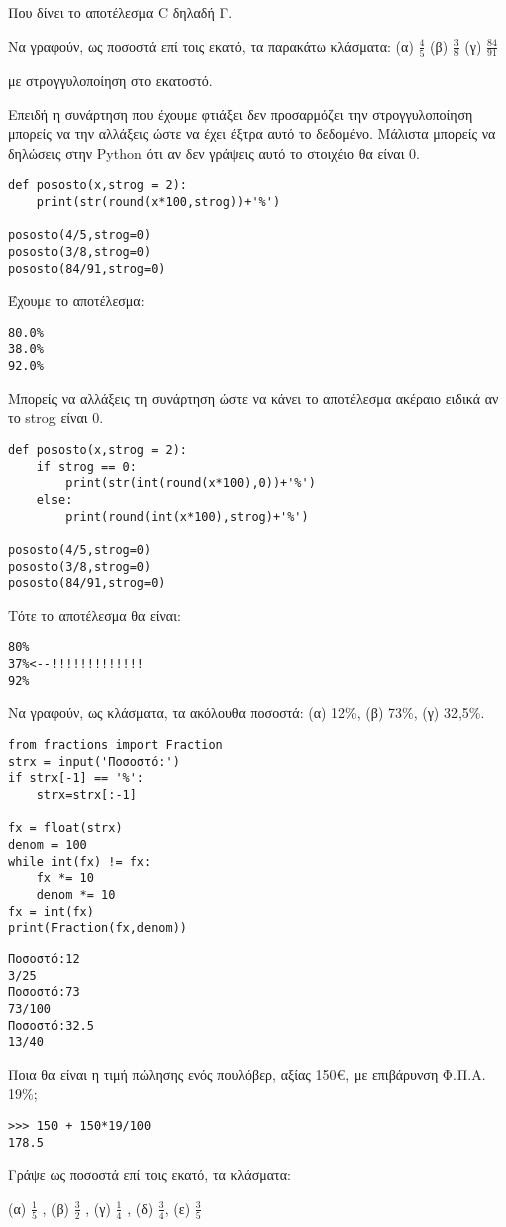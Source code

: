 Που δίνει το αποτέλεσμα C δηλαδή Γ.

\begin{exercise}
Να γραφούν, ως ποσοστά επί τοις εκατό, τα παρακάτω κλάσματα:
(α) $\frac{4}{5}$
(β) $\frac{3}{8}$
(γ) $\frac{84}{91}$

με στρογγυλοποίηση στο εκατοστό.
\end{exercise}

Επειδή η συνάρτηση που έχουμε φτιάξει δεν προσαρμόζει την στρογγυλοποίηση μπορείς να την αλλάξεις ώστε να έχει έξτρα αυτό το δεδομένο. Μάλιστα μπορείς να δηλώσεις στην Python ότι αν δεν γράψεις αυτό το στοιχέιο θα είναι 0.
\begin{lstlisting}
def pososto(x,strog = 2):
    print(str(round(x*100,strog))+'%')

pososto(4/5,strog=0)
pososto(3/8,strog=0)
pososto(84/91,strog=0)
\end{lstlisting}

Έχουμε το αποτέλεσμα:
\begin{lstlisting}
80.0%
38.0%
92.0%
\end{lstlisting}
Μπορείς να αλλάξεις τη συνάρτηση ώστε να κάνει το αποτέλεσμα ακέραιο ειδικά αν το strog είναι 0.
\begin{lstlisting}
def pososto(x,strog = 2):
    if strog == 0:
        print(str(int(round(x*100),0))+'%')
    else:
        print(round(int(x*100),strog)+'%')

pososto(4/5,strog=0)
pososto(3/8,strog=0)
pososto(84/91,strog=0)
\end{lstlisting}

Τότε το αποτέλεσμα θα είναι:
\begin{lstlisting}
80%
37%<--!!!!!!!!!!!!!
92%
\end{lstlisting}
\begin{exercise}
Να γραφούν, ως κλάσματα, τα ακόλουθα ποσοστά: (α) 12\%, (β) 73\%, (γ) 32,5\%.
\end{exercise}

\begin{lstlisting}
from fractions import Fraction
strx = input('Ποσοστό:')
if strx[-1] == '%':
    strx=strx[:-1]

fx = float(strx)
denom = 100
while int(fx) != fx:
    fx *= 10
    denom *= 10
fx = int(fx)
print(Fraction(fx,denom))
\end{lstlisting}
\begin{lstlisting}
Ποσοστό:12
3/25
Ποσοστό:73
73/100
Ποσοστό:32.5
13/40
\end{lstlisting}
\begin{exercise}
Ποια θα είναι η τιμή πώλησης ενός πουλόβερ, αξίας 150€, με επιβάρυνση Φ.Π.Α. 19\%;
\end{exercise}
\begin{lstlisting}
>>> 150 + 150*19/100
178.5
\end{lstlisting}
\begin{exercise}
Γράψε   ως  ποσοστά επί τοις    εκατό,  τα  κλάσματα:   

(α)  $\frac{1}{5}$ , (β)     $\frac{3}{2}$ , (γ)    $\frac{1}{4}$ , (δ) $\frac{3}{4}$,  (ε) $\frac{3}{5}$
\end{exercise}

